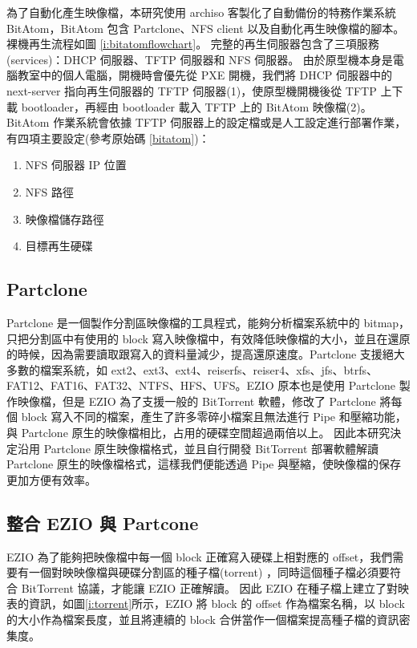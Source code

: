 為了自動化產生映像檔，本研究使用 archiso 客製化了自動備份的特務作業系統 BitAtom，BitAtom 包含 Partclone、NFS client 以及自動化再生映像檔的腳本。
裸機再生流程如圖 \ref{i:bitatomflowchart}。
完整的再生伺服器包含了三項服務(services)：DHCP 伺服器、TFTP 伺服器和 NFS 伺服器。
由於原型機本身是電腦教室中的個人電腦，開機時會優先從 PXE 開機，我們將 DHCP 伺服器中的 next-server 指向再生伺服器的 TFTP 伺服器(1)，使原型機開機後從 TFTP 上下載 bootloader，再經由 bootloader 載入 TFTP 上的 BitAtom 映像檔(2)。BitAtom 作業系統會依據 TFTP 伺服器上的設定檔或是人工設定進行部署作業，有四項主要設定(參考原始碼 \ref{bitatom})：
\begin{enumerate}
\item NFS 伺服器 IP 位置
\item NFS 路徑
\item 映像檔儲存路徑
\item 目標再生硬碟
\end{enumerate}



\subsection{Partclone}
Partclone 是一個製作分割區映像檔的工具程式，能夠分析檔案系統中的 bitmap，只把分割區中有使用的 block 寫入映像檔中，有效降低映像檔的大小，並且在還原的時候，因為需要讀取跟寫入的資料量減少，提高還原速度。Partclone 支援絕大多數的檔案系統，如 ext2、ext3、ext4、reiserfs、reiser4、xfs、jfs、btrfs、FAT12、FAT16、FAT32、NTFS、HFS、UFS。EZIO 原本也是使用 Partclone 製作映像檔，但是 EZIO 為了支援一般的 BitTorrent 軟體，修改了 Partclone 將每個 block 寫入不同的檔案，產生了許多零碎小檔案且無法進行 Pipe 和壓縮功能，與 Partclone 原生的映像檔相比，占用的硬碟空間超過兩倍以上。
因此本研究決定沿用 Partclone 原生映像檔格式，並且自行開發 BitTorrent 部署軟體解讀 Partclone 原生的映像檔格式，這樣我們便能透過 Pipe 與壓縮，使映像檔的保存更加方便有效率。


\subsection{整合 EZIO 與 Partcone} \label{ezio_and_partclone}

EZIO 為了能夠把映像檔中每一個 block 正確寫入硬碟上相對應的 offset，我們需要有一個對映映像檔與硬碟分割區的種子檔(torrent) ，同時這個種子檔必須要符合 BitTorrent 協議，才能讓 EZIO 正確解讀。
因此 EZIO 在種子檔上建立了對映表的資訊，如圖\ref{i:torrent}所示，EZIO 將 block 的 offset 作為檔案名稱，以 block 的大小作為檔案長度，並且將連續的 block 合併當作一個檔案提高種子檔的資訊密集度。


